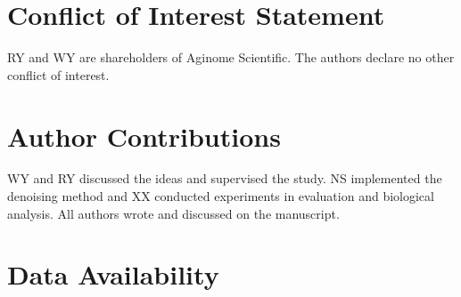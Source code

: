 \documentclass{mynature}
\begin{document}
\section*{Conflict of Interest Statement}

RY and WY are shareholders of Aginome Scientific. The authors declare no other conflict of interest.

\section*{Author Contributions}

WY and RY discussed the ideas and supervised the study. NS implemented the denoising method and XX conducted experiments in evaluation and biological analysis. All authors wrote and discussed on the manuscript.




\section*{Data Availability}

\end{document}
